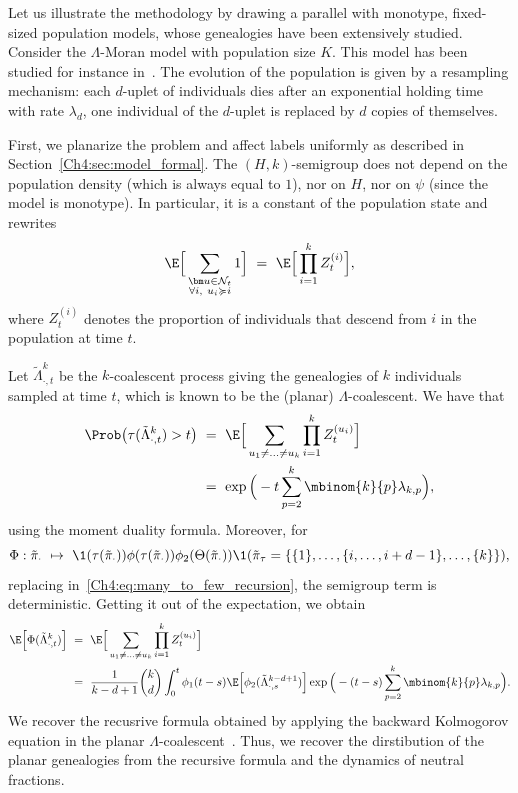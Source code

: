 \begin{refsegment}
\begin{rem}
Let us illustrate the methodology by drawing a parallel with monotype, fixed-sized population models, whose genealogies have been extensively studied.
Consider the $\Lambda$-Moran model with population size $K$.  This model has been studied for instance in~\citet{etheridge_coalescent_2010,birkner_measure-valued_2009}.
The evolution of the population is given by a resampling mechanism: each $d$-uplet of individuals dies after an exponential holding time with rate $\lambda_d$, one individual of the $d$-uplet is replaced by $d$ copies of themselves.

First, we planarize the problem and affect labels uniformly as described in Section~\ref{Ch4:sec:model_formal}. The $(H,k)$-semigroup does not depend on the population density (which is always equal to $1$), nor on $H$, nor on $\psi$ (since the model is monotype).  In particular, it is a constant of the population state and rewrites
\[
\E\Big[\sum_{\substack{\bm u\in \mathcal{N}_t\\ \forall i,\ u_i\succcurlyeq i}}1 \Big]\ =\ \E\Big[\prod_{i=1}^k Z^{(i)}_t \Big],
\]
where $Z^{(i)}_t$ denotes the proportion of individuals that descend from $i$ in the population at time $t$.

Let $\tilde\Lambda^{k}_{\cdot, t}$ be the $k$-coalescent process giving the genealogies of $k$ individuals sampled at time $t$, which is known to be the (planar) $\Lambda$-coalescent.
We have that
\begin{align*}
\Prob\big(\tau(\tilde\Lambda^{k}_{\cdot, t}) >t\big)\ &=\ \E\Big[\sum_{u_1\neq \ldots \neq u_k}\prod_{i=1}^k Z^{(u_i)}_t \Big]\\
& =\ \exp\Big(-t\sum_{p=2}^k \mbinom{k}{p} \lambda_{k,p}\Big),
\end{align*}
using the moment duality formula. Moreover, for 
\[
\Phi:\tilde\pi_\cdot\ \mapsto\ \1(\tau(\tilde\pi_\cdot ))\phi(\tau(\tilde\pi_\cdot ))\phi_2(\Theta(\tilde \pi_\cdot))\1(\tilde\pi_\tau = \{\{1\},\ldots, \{ i,\ldots, i+d-1\},\ldots,\{k\}\}),\]
replacing in~\eqref{Ch4:eq:many_to_few_recursion}, the semigroup term is deterministic. Getting it out of the expectation, we obtain
\begin{align*}
\E\Big[\Phi(\tilde\Lambda^{k}_{\cdot, t}) \Big]\ &=\ \E\Big[\sum_{u_1\neq \ldots \neq u_k}\prod_{i=1}^k Z^{(u_i)}_t \Big]\\
& =\ \frac{1}{k-d+1}\binom{k}{d}\int_0^t \phi_1(t-s)\E\Big[\phi_2(\tilde\Lambda^{k-d+1}_{\cdot, s})\Big]\exp\Big(-(t-s)\sum_{p=2}^k \mbinom{k}{p} \lambda_{k,p}\Big).
\end{align*}
We recover the recusrive formula obtained by applying the backward Kolmogorov equation in the planar $\Lambda$-coalescent~\citep{Foutel-Rodier:UMS}. Thus, we recover the dirstibution of the planar genealogies from the recursive formula and the dynamics of neutral fractions.
\end{rem}


\end{refsegment}
